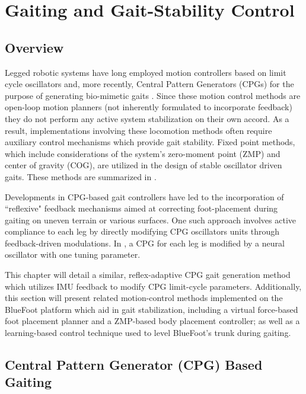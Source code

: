 \chapter{Gaiting and Gait-Stability Control}
	\label{ch::gait_control}
	

	\section{Overview}

		Legged robotic systems have long employed motion controllers based on limit cycle oscillators and, more recently, Central Pattern Generators (CPGs)  for the purpose of generating bio-mimetic gaits \cite{Matsuoka1985,Collins1993,Endo2004,Righetti2006,Ijspeert2008,Matos2010,Ajallooeian2013,Park2014,Fukuoka2015}. Since these motion control methods are open-loop motion planners (\IE not inherently formulated to incorporate feedback) they do not perform any active system stabilization on their own accord. As a result, implementations involving these  locomotion methods often require auxiliary control mechanisms which provide gait stability. Fixed point methods, which include considerations of the system's zero-moment point (ZMP) and center of gravity (COG), are utilized in the design of stable oscillator driven gaits. These methods are summarized in \cite{Wieber2015}. %

		Developments in CPG-based gait controllers have led to the incorporation of ``reflexive" feedback mechanisms aimed at correcting foot-placement during gaiting on uneven terrain or various surfaces. One such approach involves active compliance to each leg by directly modifying CPG oscillators units through feedback-driven modulations. In \cite{Fukuoka2003,Endo2004}, a CPG for each leg is modified by a neural oscillator with one tuning parameter. 

		This chapter will detail a similar, reflex-adaptive CPG gait generation method which utilizes IMU feedback to modify CPG limit-cycle parameters. Additionally, this section will present related motion-control methods implemented on the BlueFoot platform which aid in gait stabilization, including a virtual force-based foot placement planner and a ZMP-based body placement controller; as well as a learning-based control technique used to level BlueFoot's trunk during gaiting.


	\section{Central Pattern Generator (CPG) Based Gaiting}

